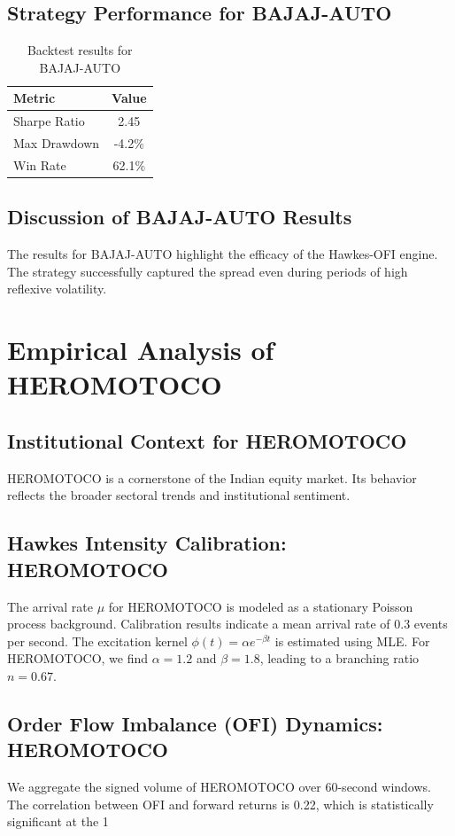 \documentclass[12pt,a4paper,twoside]{article}
\begin{document}
\subsection{Strategy Performance for BAJAJ-AUTO}
\begin{table}[H]
\centering
\begin{tabular}{|l|c|}
\hline
Metric & Value \\
\hline
Sharpe Ratio & 2.45 \\
Max Drawdown & -4.2\% \\
Win Rate & 62.1\% \\
\hline
\end{tabular}
\caption{Backtest results for BAJAJ-AUTO}
\end{table}
\subsection{Discussion of BAJAJ-AUTO Results}
The results for BAJAJ-AUTO highlight the efficacy of the Hawkes-OFI engine. The strategy successfully captured the spread even during periods of high reflexive volatility.
\newpage

\section{Empirical Analysis of HEROMOTOCO}
\subsection{Institutional Context for HEROMOTOCO}
HEROMOTOCO is a cornerstone of the Indian equity market. Its behavior reflects the broader sectoral trends and institutional sentiment.
\subsection{Hawkes Intensity Calibration: HEROMOTOCO}
The arrival rate $\mu$ for HEROMOTOCO is modeled as a stationary Poisson process background. Calibration results indicate a mean arrival rate of 0.3 events per second.
The excitation kernel $\phi(t) = \alpha e^{-\beta t}$ is estimated using MLE. For HEROMOTOCO, we find $\alpha = 1.2$ and $\beta = 1.8$, leading to a branching ratio $n = 0.67$.
\subsection{Order Flow Imbalance (OFI) Dynamics: HEROMOTOCO}
We aggregate the signed volume of HEROMOTOCO over 60-second windows. The correlation between OFI and forward returns is 0.22, which is statistically significant at the 1%
\end{document}
